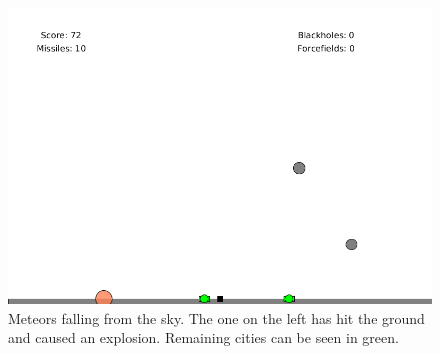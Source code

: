 \documentclass{article}
\begin{document}
\begin{figure}[H]
\centering
\includegraphics[width=1\textwidth, keepaspectratio]{imgs/Meteors.png}
\caption{Meteors falling from the sky. The one on the left has hit the ground and caused an explosion. Remaining cities can be seen in green.}
\end{figure}
\end{document}
